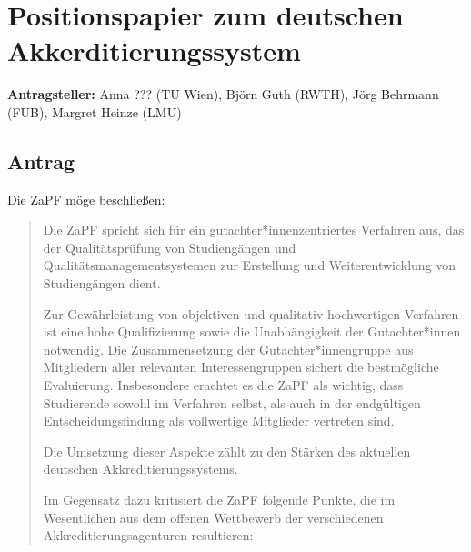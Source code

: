 \documentclass[draft,10pt,oneside]{scrartcl}
\begin{document}
\section*{Positionspapier zum deutschen Akkerditierungssystem}

\textbf{Antragsteller:} Anna ??? (TU Wien), Björn Guth (RWTH), Jörg Behrmann (FUB), Margret Heinze (LMU)

\subsection*{Antrag}

Die ZaPF möge beschließen:

\begin{quote}
	Die ZaPF spricht sich für ein gutachter*innenzentriertes Verfahren aus, das
	der Qualitätsprüfung von Studiengängen und Qualitätsmanagementsystemen zur
	Erstellung und Weiterentwicklung von Studiengängen dient.

	Zur Gewährleistung von objektiven und qualitativ hochwertigen Verfahren ist
	eine hohe Qualifizierung sowie die Unabhängigkeit der Gutachter*innen
	notwendig. Die Zusammensetzung der Gutachter*innengruppe aus Mitgliedern
	aller relevanten Interessengruppen sichert die bestmögliche Evaluierung.
	Insbesondere erachtet es die ZaPF als wichtig, dass Studierende sowohl im
	Verfahren selbst, als auch in der endgültigen Entscheidungsfindung als
	vollwertige Mitglieder vertreten sind.

	Die Umsetzung dieser Aspekte zählt zu den Stärken des aktuellen deutschen
	Akkreditierungssystems.

	Im Gegensatz dazu kritisiert die ZaPF folgende Punkte, die im Wesentlichen
	aus dem offenen Wettbewerb der verschiedenen Akkreditierungsagenturen
	resultieren:


\end{quote}
\end{document}
